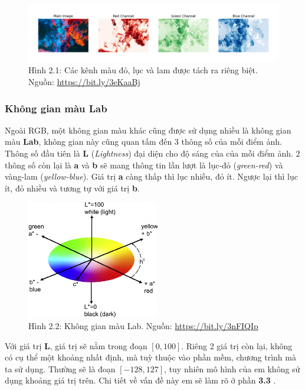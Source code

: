 \documentclass[a4paper]{article}
\begin{document}
\begin{figure}[h!]
\centering
\includegraphics[width=16.1cm]{images/2_1.jpeg}
\caption{Hình 2.1: Các kênh màu đỏ, lục và lam được tách ra riêng biệt. Nguồn: \href{https://bit.ly/3eKaaBj}{https://bit.ly/3eKaaBj}}
\end{figure}

\subsubsection{Không gian màu Lab}
Ngoài RGB, một không gian màu khác cũng được sử dụng nhiều là không gian màu \textbf{Lab}, không gian này cũng quan tấm đến 3 thông số của mỗi điểm ảnh. Thông số đầu tiên là \textbf{L} (\textit{Lightness}) đại diện cho độ sáng của của mỗi điểm ảnh. 2 thông số còn lại là \textbf{a} và \textbf{b} sẽ mang thông tin lần lượt là lục-đỏ (\textit{green-red}) và vàng-lam (\textit{yellow-blue}). Giá trị \textbf{a} càng thấp thì lục nhiều, đỏ ít. Ngược lại thì lục ít, đỏ nhiều và tương tự với giá trị \textbf{b}.

\begin{figure}[h!]
\centering
\includegraphics[width=5.8cm]{images/2_2.png}
\caption{Hình 2.2: Không gian màu Lab. Nguồn: \href{https://bit.ly/3nFIQIp}{https://bit.ly/3nFIQIp}}
\end{figure}

\noindent
Với giá trị \textbf{L}, giá trị sẽ nằm trong đoạn $[0, 100]$. Riêng 2 giá trị còn lại, không có cụ thể một khoảng nhất định, mà tuỳ thuộc vào phần mềm, chương trình mà ta sử dụng. Thường sẽ là đoạn $[-128, 127]$, tuy nhiên mô hình của em không sử dụng khoảng giá trị trên. Chi tiết về vấn đề này em sẽ làm rõ ở phần \textbf{3.3 }.
\end{document}
